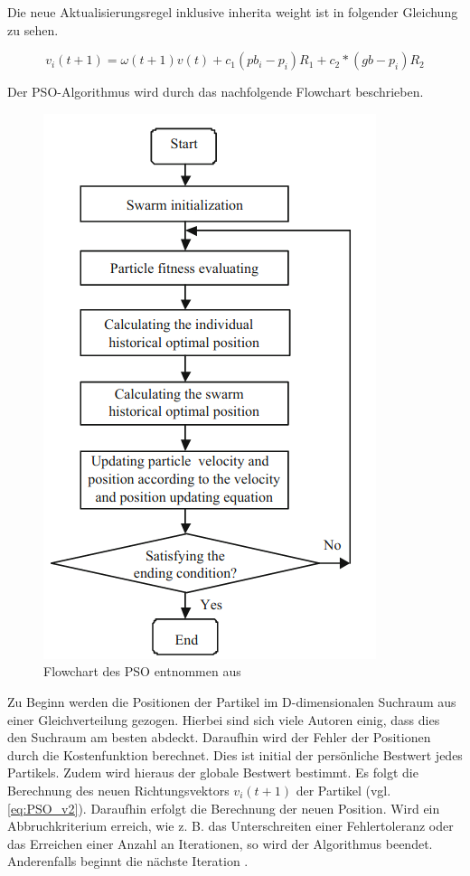 Die neue Aktualisierungsregel inklusive inherita weight ist in folgender Gleichung zu sehen.

\begin{equation}\label{eq:PSO_v2}
v_i(t+1) = \omega(t+1)v(t) + c_1(pb_i - p_i)R_1 + c_2*(gb - p_i)R_2 
\end{equation}

Der PSO-Algorithmus wird durch das nachfolgende Flowchart beschrieben.

\begin{figure}[H]
\centering
\includegraphics[width=0.5\linewidth]{figures/Grundlagen/PSO_Flowchart.png} 
\caption{Flowchart des PSO \label{fig:PSOFLowchart} entnommen aus \citep{PSO_Overview}}
\end{figure}

Zu Beginn werden die Positionen der Partikel im D-dimensionalen Suchraum aus einer Gleichverteilung gezogen. Hierbei sind sich viele Autoren einig, dass dies den Suchraum am besten abdeckt. Daraufhin wird der Fehler der Positionen durch die Kostenfunktion berechnet.
Dies ist initial der persönliche Bestwert jedes Partikels. Zudem wird hieraus der globale Bestwert bestimmt. Es folgt die Berechnung des neuen Richtungsvektors $v_i(t+1)$ der Partikel  (vgl. \ref{eq:PSO_v2}). Daraufhin erfolgt die Berechnung der neuen Position. Wird ein Abbruchkriterium erreich, wie z. B. das Unterschreiten einer Fehlertoleranz oder das Erreichen einer Anzahl an Iterationen, so wird der Algorithmus beendet. Anderenfalls beginnt die nächste Iteration \cite{MARINI2015153}.



